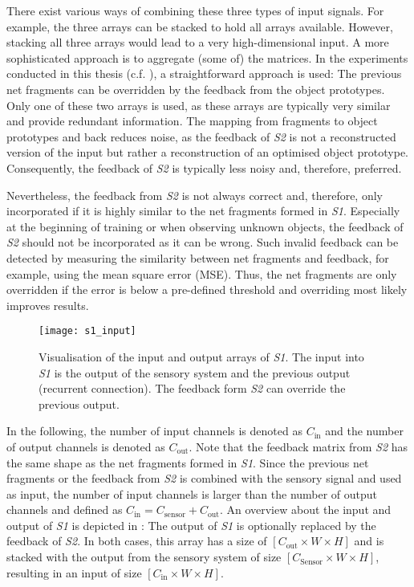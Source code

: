 There exist various ways of combining these three types of input signals. For example, the three arrays can be stacked to hold all arrays available.
However, stacking all three arrays would lead to a very high-dimensional input.
A more sophisticated approach is to aggregate (some of) the matrices.
In the experiments conducted in this thesis (c.f. ), a straightforward approach is used: The previous net fragments can be overridden by the feedback from the object prototypes.
Only one of these two arrays is used, as these arrays are typically very similar and provide redundant information. The mapping from fragments to object prototypes and back reduces noise, as the feedback of \emph{S2} is not a reconstructed version of the input but rather a reconstruction of an optimised object prototype. Consequently, the feedback of \emph{S2} is typically less noisy and, therefore, preferred.

Nevertheless, the feedback from \emph{S2} is not always correct and, therefore, only incorporated if it is highly similar to the net fragments formed in \emph{S1}. Especially at the beginning of training or when observing unknown objects, the feedback of \emph{S2} should not be incorporated as it can be wrong.
Such invalid feedback can be detected by measuring the similarity between net fragments and feedback, for example, using the mean square error (MSE). Thus, the net fragments are only overridden if the error is below a pre-defined threshold and overriding most likely improves results.

\begin{figure}[h]
    \centering
    \texttt{[image: s1\_input]}
    \caption[Input and output of \emph{S1}]{Visualisation of the input and output arrays of \emph{S1}. The input into \emph{S1} is the output of the sensory system and the previous output (recurrent connection). The feedback form \emph{S2} can override the previous output.}
\end{figure}


In the following, the number of input channels is denoted as $C_{\text{in}}$ and the number of output channels is denoted as $C_{\text{out}}$.
Note that the feedback matrix from \emph{S2} has the same shape as the net fragments formed in \emph{S1}.
Since the previous net fragments or the feedback from \emph{S2} is combined with the sensory signal and used as input, the number of input channels is larger than the number of output channels and defined as $C_{\text{in}} = C_{\text{sensor}} + C_{\text{out}}$.
An overview about the input and output of \emph{S1} is depicted in :
The output of \emph{S1} is optionally replaced by the feedback of \emph{S2}. In both cases, this array has a size of $[C_{\text{out}} \times W \times H]$ and is stacked with the output from the sensory system of size $[C_{\text{Sensor}} \times W \times H]$, resulting in an input of size $[C_{\text{in}} \times W \times H]$.


